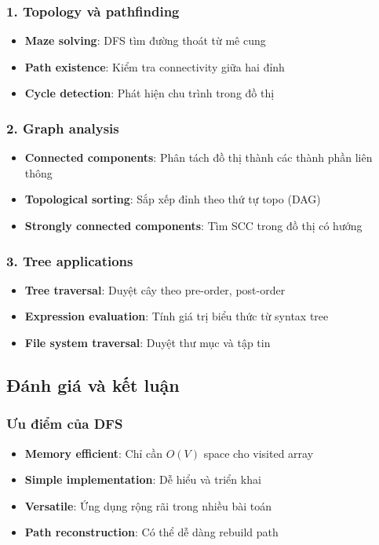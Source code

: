 \documentclass[12pt]{article}
\begin{document}
\subsubsection*{1. Topology và pathfinding}
\begin{itemize}
    \item \textbf{Maze solving}: DFS tìm đường thoát từ mê cung
    \item \textbf{Path existence}: Kiểm tra connectivity giữa hai đỉnh
    \item \textbf{Cycle detection}: Phát hiện chu trình trong đồ thị
\end{itemize}

\subsubsection*{2. Graph analysis}
\begin{itemize}
    \item \textbf{Connected components}: Phân tách đồ thị thành các thành phần liên thông
    \item \textbf{Topological sorting}: Sắp xếp đỉnh theo thứ tự topo (DAG)
    \item \textbf{Strongly connected components}: Tìm SCC trong đồ thị có hướng
\end{itemize}

\subsubsection*{3. Tree applications}
\begin{itemize}
    \item \textbf{Tree traversal}: Duyệt cây theo pre-order, post-order
    \item \textbf{Expression evaluation}: Tính giá trị biểu thức từ syntax tree
    \item \textbf{File system traversal}: Duyệt thư mục và tập tin
\end{itemize}

\subsection*{Đánh giá và kết luận}

\subsubsection*{Ưu điểm của DFS}
\begin{itemize}
    \item \textbf{Memory efficient}: Chỉ cần $O(V)$ space cho visited array
    \item \textbf{Simple implementation}: Dễ hiểu và triển khai
    \item \textbf{Versatile}: Ứng dụng rộng rãi trong nhiều bài toán
    \item \textbf{Path reconstruction}: Có thể dễ dàng rebuild path
\end{itemize}
\end{document}
